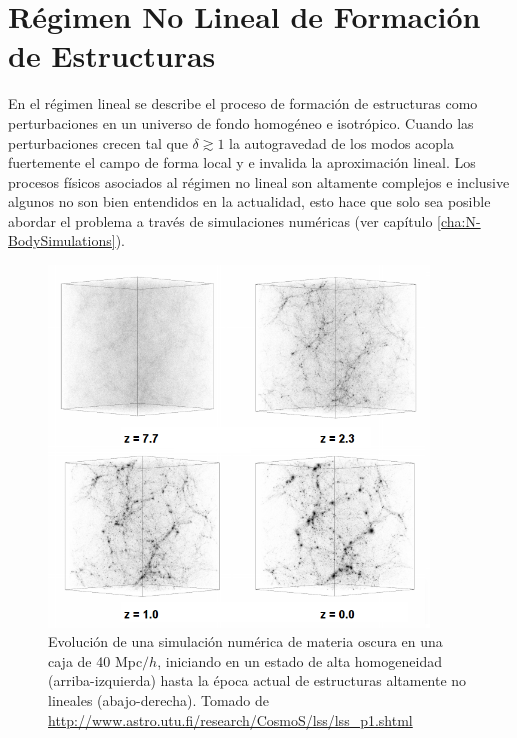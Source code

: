 \section{Régimen No Lineal de Formación de Estructuras}
\label{sec:NonLinearStructureFormation}


En el régimen lineal se describe el proceso de formación de estructuras 
como perturbaciones en un universo de fondo homogéneo e isotrópico. Cuando
las perturbaciones crecen tal que $\delta \gtrsim 1$ la autogravedad de 
los modos acopla fuertemente el campo de forma local y e invalida la 
aproximación lineal. Los procesos físicos asociados al régimen no lineal
son altamente complejos e inclusive algunos no son bien entendidos en la 
actualidad, esto hace que solo sea posible abordar el problema a través de
simulaciones numéricas (ver capítulo 
\ref{cha:N-BodySimulations}).


\begin{figure}[htbp]
	\centering
	\includegraphics[width=0.9\textwidth]
	{./figures/2_theoretical_framework/Nonlinear.png}

	\caption{\small{Evolución de una simulación numérica de materia oscura
	en una caja de 40 Mpc$/h$, iniciando en un estado de alta homogeneidad 
	(arriba-izquierda) hasta la época actual de estructuras altamente no 
	lineales (abajo-derecha). Tomado de 
	\url{http://www.astro.utu.fi/research/CosmoS/lss/lss_p1.shtml}}}
	
	\label{fig:NonLinearUniverse}
\end{figure}


